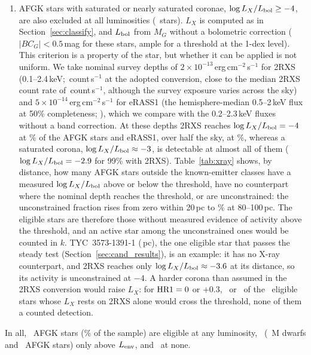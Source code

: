 \documentclass[linenumbers]{aastex702}
\begin{document}
\begin{enumerate}
\item AFGK stars with saturated or nearly saturated coronae, $\log L_X/L_{\rm bol}\ge-4$, are also excluded at all luminosities (\NExclHot\ stars). $L_X$ is computed as in Section~\ref{sec:classify}, and $L_{\rm bol}$ from $M_G$ without a bolometric correction ($|BC_G|<0.5$\,mag for these stars, ample for a threshold at the 1-dex level). This criterion is a property of the star, but whether it can be applied is not uniform. We take nominal survey depths of $2\times10^{-13}$\,erg\,cm$^{-2}$\,s$^{-1}$ for 2RXS (0.1--2.4\,keV; \RxsDepthCR\,count\,s$^{-1}$ at the adopted conversion, close to the median 2RXS count rate of \RxsMedCR\,count\,s$^{-1}$, although the survey exposure varies across the sky) and $5\times10^{-14}$\,erg\,cm$^{-2}$\,s$^{-1}$ for eRASS1 (the hemisphere-median 0.5--2\,keV flux at 50\% completeness; \citealt{Merloni2024}), which we compare with the 0.2--2.3\,keV fluxes without a band correction. At these depths 2RXS reaches $\log L_X/L_{\rm bol}=-4$ at \XLimRxsPctFour\% of the AFGK stars and eRASS1, over half the sky, at \XLimEraPctFour\%, whereas a saturated corona, $\log L_X/L_{\rm bol}\approx-3$, is detectable at almost all of them ($\log L_X/L_{\rm bol}=-2.9$ for 99\% with 2RXS). Table~\ref{tab:xray} shows, by distance, how many AFGK stars outside the known-emitter classes have a measured $\log L_X/L_{\rm bol}$ above or below the threshold, have no counterpart where the nominal depth reaches the threshold, or are unconstrained: the unconstrained fraction rises from zero within 20\,pc to \PctXUncHundred\% at 80--100\,pc. The eligible stars are therefore those without measured evidence of activity above the threshold, and an active star among the unconstrained ones would be counted in $k$. TYC~3573-1391-1 (\TycDist\,pc), the one eligible star that passes the steady test (Section~\ref{sec:cand_results}), is an example: it has no X-ray counterpart, and 2RXS reaches only $\log L_X/L_{\rm bol}\approx-3.6$ at its distance, so its activity is unconstrained at $-4$. A harder corona than assumed in the 2RXS conversion would raise $L_X$: for ${\rm HR1}=0$ or $+0.3$, \NEcfZero\ or \NEcfHard\ of the \NEligRxsOnly\ eligible stars whose $L_X$ rests on 2RXS alone would cross the threshold, none of them a counted detection.
\end{enumerate}

In all, \NElig\ AFGK stars (\PctElig\% of the sample) are eligible at any luminosity, \NEnv\ (\NEnvM\ M dwarfs and \NAFGKMult\ AFGK stars) only above $L_{\rm env}$, and \NExclAll\ at none.
\end{document}
